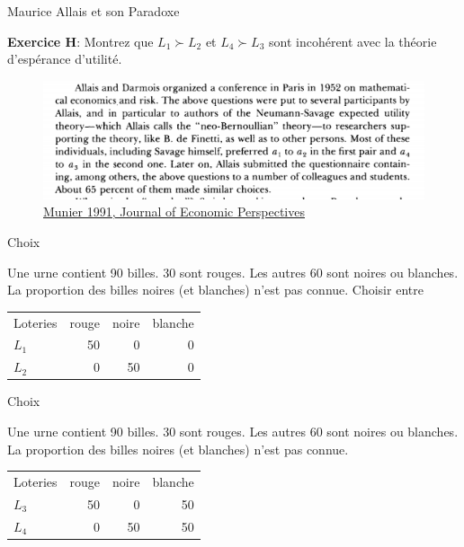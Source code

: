 \documentclass[handout]{beamer}
\begin{document}
\begin{frame}{Maurice Allais et son Paradoxe}

\textbf{Exercice H}: Montrez que $L_1 \succ L_2$ et $L_4 \succ L_3$ sont incohérent avec la théorie d'espérance d'utilité. 

\begin{figure}
\centering
\includegraphics[scale=0.5]{allais.png}
\caption{\href{https://pubs.aeaweb.org/doi/pdf/10.1257/jep.5.2.179}{Munier 1991, Journal of Economic Perspectives}}
\end{figure}

\end{frame}

\begin{frame}{Choix}

Une urne contient 90 billes. 30 sont rouges. Les autres 60 sont noires ou blanches. La proportion des billes noires (et blanches) n'est pas connue. 
Choisir entre
\begin{table}[H]
\begin{tabular}{lrrr}
\hline \hline
Loteries & rouge & noire & blanche \\
$L_1$ & 50 & 0 & 0 \\
$L_2$ & 0 & 50 & 0 \\
\hline \hline 
\end{tabular}
\end{table} 

\end{frame}

\begin{frame}{Choix}

Une urne contient 90 billes. 30 sont rouges. Les autres 60 sont noires ou blanches. La proportion des billes noires (et blanches) n'est pas connue.

\begin{table}[H]
\begin{tabular}{lrrr}
\hline \hline
Loteries & rouge & noire & blanche \\
$L_3$ & 50 & 0 & 50 \\
$L_4$ & 0 & 50 & 50 \\
\hline \hline 
\end{tabular}
\end{table} 
\pause

\end{frame}
\end{document}
